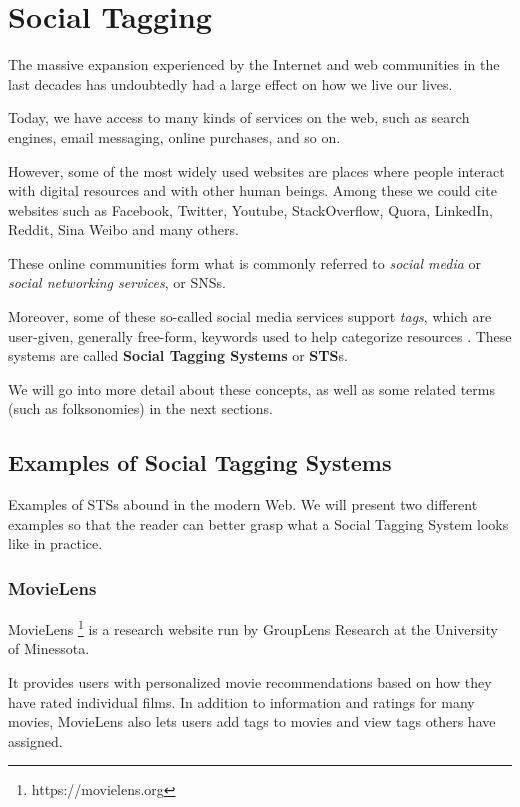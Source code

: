 \chapter{Social Tagging}\label{chap:social_tagging}

The massive expansion experienced by the Internet and web communities in the last decades has undoubtedly had a large effect on how we live our lives.

Today, we have access to many kinds of services on the web, such as search engines, email messaging, online purchases, and so on.

However, some of the most widely used websites are places where people interact with digital resources and with other human beings. Among these we could cite websites such as Facebook, Twitter, Youtube, StackOverflow, Quora, LinkedIn, Reddit, Sina Weibo and many others.

These online communities form what is commonly referred to \textit{social media} or \textit{social networking services}, or SNSs. \citep{obar_wildman_2015,hamburger_etal_2017}

Moreover, some of these so-called social media services support \textit{tags}, which are user-given, generally free-form, keywords used to help categorize resources \cite{mathes_2004}. These systems are called \textbf{Social Tagging Systems} or \textbf{STS}s.

We will go into more detail about these concepts, as well as some related terms (such as folksonomies) in the next sections.

\section{Examples of Social Tagging Systems}

Examples of STSs abound in the modern Web. We will present two different examples so that the reader can better grasp what a Social Tagging System looks like in practice.

\subsection{MovieLens}

MovieLens \footnote{https://movielens.org} is a research website run by GroupLens Research at the University of Minessota.

It provides users with personalized movie recommendations based on how they have rated individual films. In addition to information and ratings for many movies, MovieLens also lets users add tags to movies and view tags others have assigned.


